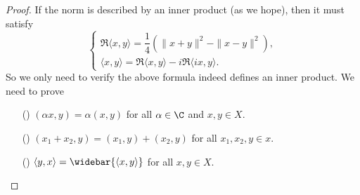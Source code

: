 \begin{proof}
If the norm is described by an inner product (as we hope), then it must satisfy
\[\begin{cases}
\Re\langle x,y\rangle=\dfrac{1}{4}(\|x+y\|^2-\|x-y\|^2),\\[8pt]
\langle x,y\rangle=\Re\langle x,y\rangle-i\Re\langle ix,y\rangle.
\end{cases}\]
So we only need to verify the above formula indeed defines an inner product. We need to prove
\begin{itemize}
\item[(\rmnum{1})] $(\alpha x,y)=\alpha(x,y)$ for all $\alpha\in\C$ and $x,y\in X$.
\item[(\rmnum{2})] $(x_1+x_2,y)=(x_1,y)+(x_2,y)$ for all $x_1,x_2,y\in x$.
\item[(\rmnum{3})] $\langle y,x\rangle=\widebar{\langle x,y\rangle}$ for all $x,y\in X$.
\end{itemize}


\end{proof}
